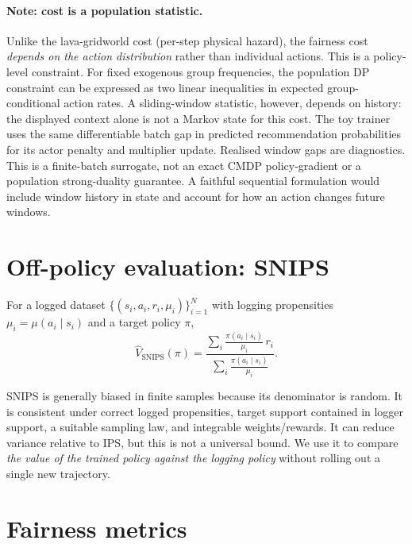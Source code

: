 \documentclass[11pt,oneside]{scrbook}
\begin{document}
\paragraph{Note: cost is a population statistic.}
Unlike the lava-gridworld cost (per-step physical hazard), the fairness cost
\emph{depends on the action distribution} rather than individual actions.
This is a policy-level constraint. For fixed exogenous group frequencies,
the population DP constraint can be expressed as two linear inequalities
in expected group-conditional action rates. A sliding-window statistic,
however, depends on history: the displayed context alone is not a Markov
state for this cost. The toy trainer uses the same differentiable batch gap in predicted recommendation probabilities for its actor penalty and multiplier update. Realised window gaps are diagnostics. This is a finite-batch surrogate, not an exact CMDP policy-gradient or a population strong-duality guarantee. A faithful sequential formulation would include window history
in state and account for how an action changes future windows.

\section{Off-policy evaluation: SNIPS}

\begin{definition}\label{def:snips}
For a logged dataset $\{(s_i, a_i, r_i, \mu_i)\}_{i=1}^N$ with logging
propensities $\mu_i = \mu(a_i \mid s_i)$ and a target policy $\pi$,
\[
   \hat V_\text{SNIPS}(\pi) = \frac{\sum_i \frac{\pi(a_i \mid s_i)}{\mu_i}\, r_i}
                                  {\sum_i \frac{\pi(a_i \mid s_i)}{\mu_i}}.
\]
\end{definition}

SNIPS is generally biased in finite samples because its denominator is random.
It is consistent under correct logged propensities, target support contained
in logger support, a suitable sampling law, and integrable weights/rewards.
It can reduce variance relative to IPS, but this is not a universal bound. We use it to compare \emph{the value of the
trained policy against the logging policy} without rolling out a single new
trajectory.

\section{Fairness metrics}
\end{document}
